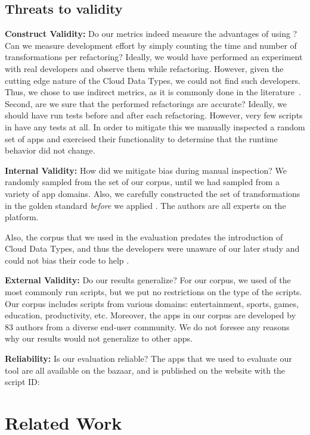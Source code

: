 \documentclass{sigplanconf}
\begin{document}
\subsection{Threats to validity}
\textbf{Construct Validity:}  Do our metrics indeed measure the advantages of using \tool? Can we measure development effort by simply counting the time and number of transformations per refactoring? Ideally, we would have performed an experiment with real \TD developers and observe them while refactoring. However, given the cutting edge nature of the Cloud Data Types, we could not find such developers. Thus, we chose to use indirect metrics, as it is commonly done in the literature~\cite{Gyori:Lambdaficator,Wloka:Reentrancer}. 
Second, are we sure that the performed refactorings are accurate? Ideally, we should have run tests before and after each refactoring. However, very few scripts in \TD have any tests at all. In order to mitigate this we manually inspected a random set of \numManual apps and exercised their functionality to determine that the runtime behavior did not change.

\textbf{Internal Validity:}  How did we mitigate bias during manual inspection? We randomly sampled from the set of our corpus, until we had sampled from a variety of app domains. Also, we carefully constructed the set of transformations in the golden standard \emph{before} we applied \tool. The authors are all experts on the \TD platform.

Also, the corpus that we used in the evaluation predates the introduction of Cloud Data Types, and thus the developers were unaware of our later study and could not bias their code to help \tool. 

\textbf{External Validity:}  Do our results generalize? For our corpus, we used \numScripts of the most commonly run scripts, but we put no restrictions on the type of the scripts.  Our corpus includes scripts from various domains: entertainment, sports, games, education, productivity, etc. Moreover, the apps in our corpus are developed by 83 authors from a diverse end-user community. We do not foresee any reasons why our results would not generalize to other \TD apps.  

\textbf{Reliability:} Is our evaluation reliable? The apps that we used to evaluate our tool are all available on the \TD bazaar, and \tool is published on the \TD website with the script ID: 



\section{Related Work}
\label{sec:relatedWork}
\end{document}
